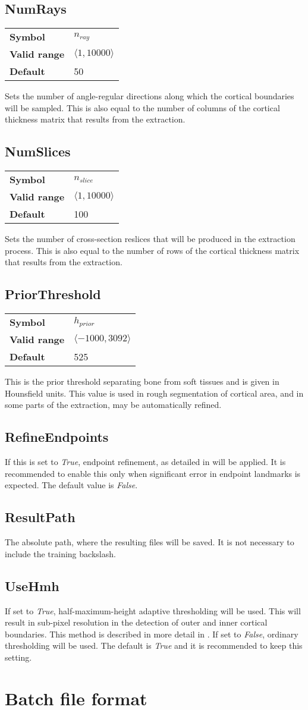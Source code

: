 \documentclass[11pt,twoside,a4paper,titlepage]{report}
\newcommand{\valref}[3]{
	\begin{table}[h!]
	\begin{tabular}{l l}
		\textbf{Symbol} & #1\\
		\textbf{Valid range} & #2\\
		\textbf{Default} & #3
	\end{tabular}
	\end{table} 
}
\begin{document}
\subsection{NumRays}
\valref{\(n_{ray}\)}{\(\langle 1, 10000\rangle\)}{50}
Sets the number of angle-regular directions along which the cortical boundaries will be sampled.
This is also equal to the number of columns of the cortical thickness matrix that results from the extraction.

\subsection{NumSlices}
\valref{\(n_{slice}\)}{\(\langle 1, 10000\rangle\)}{100}
Sets the number of cross-section reslices that will be produced in the extraction process.
This is also equal to the number of rows of the cortical thickness matrix that results from the extraction.

\subsection{PriorThreshold}
\valref{\(h_{prior}\)}{\(\langle -1000, 3092\rangle\)}{525}
This is the prior threshold separating bone from soft tissues and is given in Hounsfield units. 
This value is used in rough segmentation of cortical area, and in some parts of the extraction, may be automatically refined.

\subsection{RefineEndpoints}
If this is set to \emph{True}, endpoint refinement, as detailed in \cite{dupej2017} will be applied.
It is recommended to enable this only when significant error in endpoint landmarks is expected.
The default value is \emph{False}.

\subsection{ResultPath}
The absolute path, where the resulting files will be saved.
It is not necessary to include the training backslash.

\subsection{UseHmh}
If set to \emph{True}, half-maximum-height adaptive thresholding \cite{spoor1993} will be used.
This will result in sub-pixel resolution in the detection of outer and inner cortical boundaries.
This method is described in more detail in \cite{dupej2017}.
If set to \emph{False}, ordinary thresholding will be used.
The default is \emph{True} and it is recommended to keep this setting.

\section{Batch file format}



\end{document}
